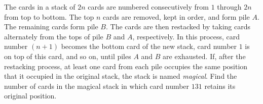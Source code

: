 The cards in a stack of $2n$ cards are numbered consecutively from $1$ through $2n$ from top to bottom. The top $n$ cards are removed, kept in order, and form pile $A$. The remaining cards form pile $B$. The cards are then restacked by taking cards alternately from the tops of pile $B$ and $A$, respectively. In this process, card number $(n+1)$ becomes the bottom card of the new stack, card number $1$ is on top of this card, and so on, until piles $A$ and $B$ are exhausted. If, after the restacking process, at least one card from each pile occupies the same position that it occupied in the original stack, the stack is named \textit{magical}. Find the number of cards in the magical stack in which card number $131$ retains its original position.